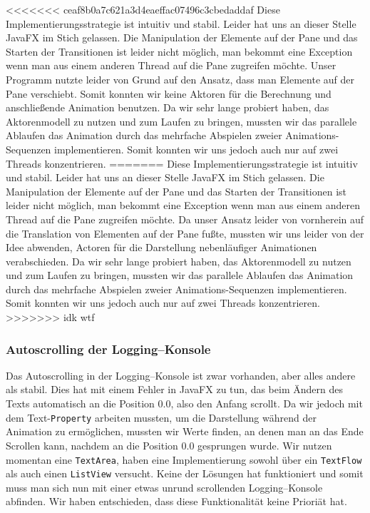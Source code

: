<<<<<<< ceaf8b0a7c621a3d4eaeffac07496c3cbedaddaf
Diese Implementierungsstrategie ist intuitiv und stabil. Leider hat uns an dieser Stelle JavaFX im Stich gelassen. Die Manipulation der Elemente auf der Pane und das Starten der Transitionen ist leider nicht möglich, man bekommt eine Exception wenn man aus einem anderen Thread auf die Pane zugreifen möchte. Unser Programm nutzte leider von Grund auf den Ansatz, dass man Elemente auf der Pane verschiebt. Somit konnten wir keine Aktoren für die Berechnung und anschließende Animation benutzen. Da wir sehr lange probiert haben, das Aktorenmodell zu nutzen und zum Laufen zu bringen, mussten wir das parallele Ablaufen das Animation durch das mehrfache Abspielen zweier Animations-Sequenzen implementieren. Somit konnten wir uns jedoch auch nur auf zwei Threads konzentrieren.
=======
Diese Implementierungsstrategie ist intuitiv und stabil. Leider hat uns an dieser Stelle JavaFX im Stich gelassen. Die Manipulation der Elemente auf der Pane und das Starten der Transitionen ist leider nicht möglich, man bekommt eine Exception wenn man aus einem anderen Thread auf die Pane zugreifen möchte. Da unser Ansatz leider von vornherein auf die Translation von Elementen auf der Pane fußte, mussten wir uns leider von der Idee abwenden, Actoren für die Darstellung nebenläufiger Animationen verabschieden. Da wir sehr lange probiert haben, das Aktorenmodell zu nutzen und zum Laufen zu bringen, mussten wir das parallele Ablaufen das Animation durch das mehrfache Abspielen zweier Animations-Sequenzen implementieren. Somit konnten wir uns jedoch auch nur auf zwei Threads konzentrieren.
>>>>>>> idk wtf

\subsubsection{Autoscrolling der Logging--Konsole}
Das Autoscrolling in der Logging--Konsole ist zwar vorhanden, aber alles andere als stabil. Dies hat mit einem Fehler in JavaFX zu tun, das beim Ändern des Texts automatisch an die Position 0.0, also den Anfang scrollt. Da wir jedoch mit dem Text-\texttt{Property} arbeiten mussten, um die Darstellung während der Animation zu ermöglichen, mussten wir Werte finden, an denen man an das Ende Scrollen kann, nachdem an die Position 0.0 gesprungen wurde. Wir nutzen momentan eine \texttt{TextArea}, haben eine Implementierung sowohl über ein \texttt{TextFlow} als auch einen \texttt{ListView} versucht. Keine der Lösungen hat funktioniert und somit muss man sich nun mit einer etwas unrund scrollenden Logging--Konsole abfinden. Wir haben entschieden, dass diese Funktionalität keine Prioriät hat.

